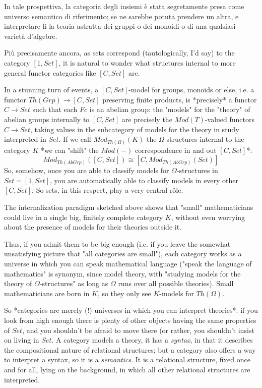 \documentclass[a4paper, 11pt]{article}
\begin{document}
In tale prospettiva, la categoria degli insiemi è stata segretamente presa come universo semantico di riferimento; se ne sarebbe potuta prendere un altra, e interpretare lì la teoria astratta dei gruppi o dei monoidi o di una qualsiasi varietà d'algebre.

Più precisamente ancora, as sets correspond (tautologically, I'd say) to the category $[1,Set]$, it is natural to wonder what structures internal to more general functor categories like $[C,Set]$ are. 

In a stunning turn of events, a $[C,Set]$-model for groups, monoids or else, i.e. a functor $Th(Grp)\to [C,Set]$ preserving finite products, is *precisely* a functor $C\to Set$ such that each $Fc$ is an abelian group: the "models" for the "theory" of abelian groups internally to $[C,Set]$ are precisely the $Mod(T)$-valued functors $C\to Set$, taking values in the subcategory of models for the theory in study interpreted in $Set$. If we call $Mod_{Th(\Omega)}( K)$ the $\Omega$-structures internal to the category $K$ *we can "shift" the $Mod(-)$ correspondence in and out $[C,Set]$*:
$$
Mod_{Th(AbGrp)}([C,Set]) \cong [C, Mod_{Th(AbGrp)}(Set)]
$$
So, somehow, once you are able to classify models for $\Omega$-structures in $Set =[1,Set]$, you are automatically able to classify models in every other $[C,Set]$. So sets, in this respect, play a very central rôle.

The internalization paradigm sketched above shows that "small" mathematicians could live in a single big, finitely complete category $K$, without even worrying about the presence of models for their theories outside it. 

Thus, if you admit them to be big enough (i.e. if you leave the somewhat unsatisfying picture that "all categories are small"), each category works as a universe in which you can speak mathematical language ("speak the language of mathematics" is synonym, since model theory, with "studying models for the theory of $\Omega$-structures" as long as $\Omega$ runs over all possible theories). Small mathematicians are born in $K$, so they only see $K$-models for $Th(\Omega)$. 

So *categories are merely (!) universes in which you can interpret theories*: if you look from high enough there is plenty of other objects having the same properties of $Set$, and you shouldn't be afraid to move there (or rather, you shouldn't insist on living in $Set$. A category models a theory, it has a \emph{syntax}, in that it describes the compositional nature of relational structures; but a category also offers a way to interpret a syntax, so it is a \emph{semantics}. It is a relational structure, fixed once and for all, lying on the background, in which all other relational structures are interpreted.
\end{document}
